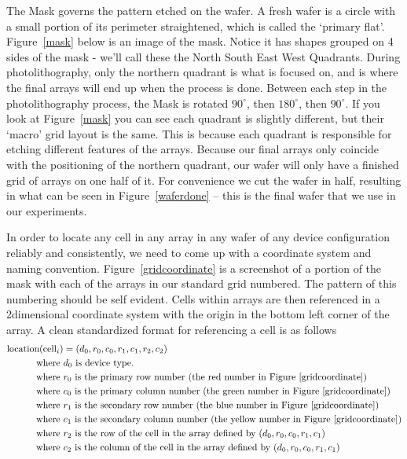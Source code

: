 \documentclass{article}
\begin{document}
          The Mask governs the pattern etched on the wafer. A fresh wafer is a circle with a small portion of its
          perimeter straightened, which is called the `primary flat'. Figure~\ref{mask} below is an image of the mask.
          Notice it has shapes grouped on 4 sides of the mask - we'll call these the North South East West Quadrants.
          During photolithography, only the northern quadrant is what is focused on, and is where the final arrays will
          end up when the process is done. Between each step in the photolithography process, the Mask is rotated
          $90^\circ$, then $180^\circ$, then $90^\circ$. If you look at Figure~\ref{mask} you can see each quadrant is
          slightly different, but their `macro' grid layout is the same. This is because each quadrant is responsible
          for etching different features of the arrays. Because our final arrays only coincide with the positioning of
          the northern quadrant, our wafer will only have a finished grid of arrays on one half of it. For convenience
          we cut the wafer in half, resulting in what can be seen in Figure~\ref{waferdone} -- this is the final wafer
          that we use in our experiments.

          In order to locate any cell in any array in any wafer of any device configuration reliably and consistently,
          we need to come up with a coordinate system and naming convention. Figure~\ref{gridcoordinate} is a screenshot
          of a portion of the mask with each of the arrays in our standard grid numbered. The pattern of this numbering
          should be self evident. Cells within arrays are then referenced in a 2dimensional coordinate system with the
          origin in the bottom left corner of the array. A clean standardized format for referencing a cell is as
          follows
          \begin{align} \label{namingconvention}
            \text{location}(\text{cell}_i) &= (d_0, r_0, c_0, r_1, c_1, r_2, c_2) \\
            \text{where } & d_0 \text{ is device type.} \notag \\
            \text{where } & r_0 \text{ is the primary row number (the red number in Figure~\ref{gridcoordinate})}\notag \\
            \text{where } & c_0 \text{ is the primary column number (the green number in Figure~\ref{gridcoordinate})}\notag \\
            \text{where } & r_1 \text{ is the secondary row number (the blue number in Figure~\ref{gridcoordinate})}\notag \\
            \text{where } & c_1 \text{ is the secondary column number (the yellow number in Figure~\ref{gridcoordinate})}\notag \\
            \text{where } & r_2 \text{ is the row of the cell in the array defined by $(d_0, r_0, c_0, r_1, c_1)$}\notag \\
            \text{where } & c_2 \text{ is the column of the cell in the array defined by $(d_0, r_0, c_0, r_1, c_1)$}\notag
          \end{align}
\end{document}
